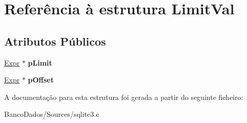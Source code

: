 \hypertarget{struct_limit_val}{\section{Referência à estrutura Limit\-Val}
\label{struct_limit_val}
}
\subsection*{Atributos Públicos}
\begin{DoxyCompactItemize}
\item 
\hypertarget{struct_limit_val_a96094d1b395a3f455263ff5907d72ed6}{\hyperlink{struct_expr}{Expr} $\ast$ {\bfseries p\-Limit}}\label{struct_limit_val_a96094d1b395a3f455263ff5907d72ed6}

\item 
\hypertarget{struct_limit_val_a43dedf453a8e5cb8091fcde524a7c736}{\hyperlink{struct_expr}{Expr} $\ast$ {\bfseries p\-Offset}}\label{struct_limit_val_a43dedf453a8e5cb8091fcde524a7c736}

\end{DoxyCompactItemize}


A documentação para esta estrutura foi gerada a partir do seguinte ficheiro\-:\begin{DoxyCompactItemize}
\item 
Banco\-Dados/\-Sources/sqlite3.\-c\end{DoxyCompactItemize}
